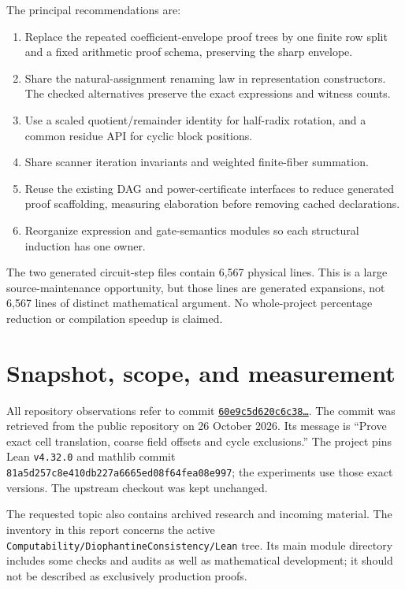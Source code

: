 \documentclass[11pt,letterpaper]{article}
\newcommand{\code}[1]{\nolinkurl{#1}}
\begin{document}
The principal recommendations are:
\begin{enumerate}
\item Replace the repeated coefficient-envelope proof trees by one finite row
  split and a fixed arithmetic proof schema, preserving the sharp envelope.
\item Share the natural-assignment renaming law in representation constructors.
  The checked alternatives preserve the exact expressions and witness counts.
\item Use a scaled quotient/remainder identity for half-radix rotation, and a
  common residue API for cyclic block positions.
\item Share scanner iteration invariants and weighted finite-fiber summation.
\item Reuse the existing DAG and power-certificate interfaces to reduce generated
  proof scaffolding, measuring elaboration before removing cached declarations.
\item Reorganize expression and gate-semantics modules so each structural
  induction has one owner.
\end{enumerate}

The two generated circuit-step files contain 6,567 physical lines. This is a
large source-maintenance opportunity, but those lines are generated expansions,
not 6,567 lines of distinct mathematical argument. No whole-project percentage
reduction or compilation speedup is claimed.

\newpage
{\small\tableofcontents}
\newpage

\section{Snapshot, scope, and measurement}

All repository observations refer to commit
\href{https://github.com/VladimirReshetnikov/ProveIt/commit/60e9c5d620c6c387d932876cfa2d9376f64ea56c}{\texttt{60e9c5d620c6c38\ldots}}.
The commit was retrieved from the public repository on 26 October 2026. Its
message is ``Prove exact cell translation, coarse field offsets and cycle
exclusions.'' The project pins Lean \code{v4.32.0} and mathlib commit
\code{81a5d257c8e410db227a6665ed08f64fea08e997}; the experiments use those exact
versions. The upstream checkout was kept unchanged.

The requested topic also contains archived research and incoming material. The
inventory in this report concerns the active \code{Computability/DiophantineConsistency/Lean}
tree. Its main module directory includes some checks and audits as well as
mathematical development; it should not be described as exclusively production proofs.
\end{document}
